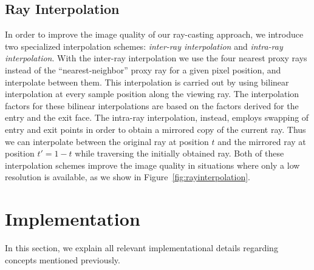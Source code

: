 \documentclass[journal]{vgtc}                %
\begin{document}
\subsection{Ray Interpolation}
In order to improve the image quality of our ray-casting approach, we introduce two specialized interpolation schemes: \emph{inter-ray interpolation} and \emph{intra-ray interpolation}. With the inter-ray interpolation we use the four nearest proxy rays instead of the ``nearest-neighbor'' proxy ray for a given pixel position, and interpolate between them. This interpolation is carried out by using bilinear interpolation at every sample position along the viewing ray. The interpolation factors for these bilinear interpolations are based on the factors derived for the entry and the exit face. The intra-ray interpolation, instead, employs swapping of entry and exit points in order to obtain a mirrored copy of the current ray. Thus we can interpolate between the original ray at position $t$ and the mirrored ray at position $t'=1-t$ while traversing the initially obtained ray. Both of these interpolation schemes improve the image quality in situations where only a low resolution is available, as we show in Figure~\ref{fig:rayinterpolation}.
%
%
%
\section{Implementation}\label{sec:implementation}\label{subsec:limitations}
In this section, we explain all relevant implementational details regarding concepts  mentioned previously.
\end{document}
